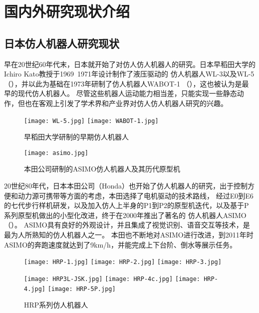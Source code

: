 \section{国内外研究现状介绍}
\subsection{日本仿人机器人研究现状}
早在20世纪60年代末，日本就开始了对仿人仿人机器人的研究。日本早稻田大学的Ichiro Kato教授于1969~1971年设计制作了液压驱动的
仿人机器人WL-3以及WL-5（），并以此为基础在1973年研制了仿人机器人WABOT-1 （），这也被认为是最早的现代仿人机器人。
尽管这些机器人运动能力相当差，只能实现一些静态动作，但也在客观上引发了学术界和产业界对仿人仿人机器人研究的兴趣。
\begin{figure}[htbp]
    \centering
        {%
            \texttt{[image: WL-5.jpg]}}
        {%
            \texttt{[image: WABOT-1.jpg]}}
    \caption{早稻田大学研制的早期仿人机器人\label{fig:japan_old}}
\end{figure}
\begin{figure}[htbp]
    \centering
    \texttt{[image: asimo.jpg]}
    \caption{\label{fig:asimo}本田公司研制的ASIMO仿人机器人及其历代原型机}
\end{figure}
20世纪80年代，日本本田公司（Honda）也开始了仿人机器人的研究，出于控制方便和动力源可携带等方面的考虑，本田选择了电机驱动的技术路线，
经过E0到E6的七代步行样机研发，以及加入仿人上半身的P1到P2的原型机迭代，以及基于P系列原型机做出的小型化改进，终于在2000年推出了著名的
仿人机器人ASIMO（）。 ASIMO具有良好的外观设计，并且集成了视觉识别、语音交互等技术，是最为人所熟知的仿人机器人之一。
本田也不断地对ASIMO进行改进，到2011年时ASIMO的奔跑速度就达到了9km/h，并能完成上下台阶、倒水等展示任务\cite{Honda}。
\begin{figure}[htbp]
    \centering
        {%
            \texttt{[image: HRP-1.jpg]}}
        {%
            \texttt{[image: HRP-2.jpg]}}
        {%
            \texttt{[image: HRP-3.jpg]}}

        {%
            \texttt{[image: HRP3L-JSK.jpg]}}   
        {%
            \texttt{[image: HRP-4c.jpg]}}       
        {%
            \texttt{[image: HRP-4.jpg]}}       
        {%
            \texttt{[image: HRP-5P.jpg]}}       

    \caption{HRP系列仿人机器人\label{fig:japan_hrp}}
\end{figure}
